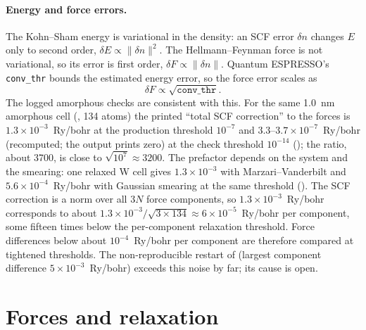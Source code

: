 \paragraph{Energy and force errors.} The Kohn--Sham energy is variational in the density: an SCF error $\delta n$
changes $E$ only to second order, $\delta E \propto \|\delta n\|^2$. The Hellmann--Feynman force is not variational, so
its error is first order, $\delta F \propto \|\delta n\|$. Quantum ESPRESSO's \texttt{conv\_thr} bounds the estimated
energy error, so the force error scales as
\begin{equation}
\delta F \propto \sqrt{\texttt{conv\_thr}} .
\label{eq:mono-dft-forceerr}
\end{equation}
The logged amorphous checks are consistent with this. For the same 1.0~nm amorphous cell (, 134
atoms) the printed ``total SCF correction'' to the forces is $1.3\times10^{-3}$~Ry/bohr at the production threshold
$10^{-7}$ and $3.3$--$3.7\times10^{-7}$~Ry/bohr (recomputed; the output prints zero) at the check threshold $10^{-14}$
(); the ratio, about 3700, is close to $\sqrt{10^{7}} \approx 3200$. The prefactor depends on the system
and the smearing: one relaxed W cell gives $1.3\times10^{-3}$ with Marzari--Vanderbilt and $5.6\times10^{-4}$~Ry/bohr
with Gaussian smearing at the same threshold (). The SCF correction is a norm over all $3N$ force
components, so $1.3\times10^{-3}$~Ry/bohr corresponds to about $1.3\times10^{-3}/\sqrt{3\times134} \approx
6\times10^{-5}$~Ry/bohr per component, some fifteen times below the per-component relaxation threshold. Force
differences below about $10^{-4}$~Ry/bohr per component are therefore compared at tightened thresholds. The
non-reproducible restart of  (largest component difference $5\times10^{-3}$~Ry/bohr) exceeds this noise
by far; its cause is open.

\section{Forces and relaxation}
\label{sec:mono-dft-forces}

